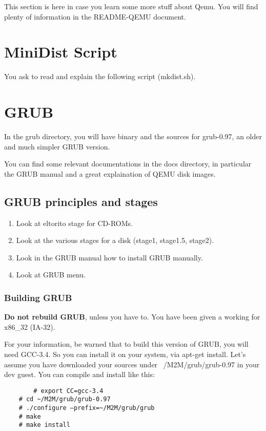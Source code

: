 \documentclass[10]{article}
\begin{document}
This section is here in case you learn some more stuff about Qemu.
You will find plenty of information in the README-QEMU document.

\section{MiniDist Script}

You ask to read and explain the following script (mkdist.sh).

\section{GRUB} 

In the grub directory, you will have binary and the sources for
grub-0.97, an older and much simpler GRUB version.

You can find some relevant documentations in the docs directory,
in particular the GRUB manual and a great explaination of QEMU disk
images.

\subsection{GRUB principles and stages}

\begin{enumerate}
\item
Look at eltorito stage for CD-ROMs.
\item
Look at the various stages for a disk (stage1, stage1.5, stage2).
\item
Look in the GRUB manual how to install GRUB manually.
\item 
Look at GRUB menu.
\end{enumerate}

\subsubsection{Building GRUB}

{\bf Do not rebuild GRUB}, unless you have to. You have been given 
a working for x86\_32 (IA-32). 

For your information, be warned that to build this version of GRUB, 
you will need GCC-3.4. So you can install it on your system, via apt-get install.
Let's assume you have downloaded your sources under ~/M2M/grub/grub-0.97
in your dev guest. You can compile and install like this:

{\em\small
\begin{verbatim}
        # export CC=gcc-3.4
	# cd ~/M2M/grub/grub-0.97
	# ./configure –prefix=~/M2M/grub/grub
	# make
	# make install 
\end{verbatim}
}
\end{document}
